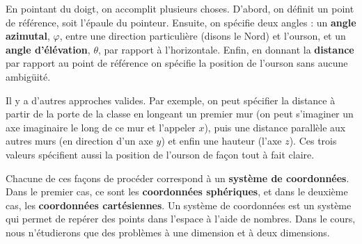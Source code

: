 \begin{marginfigure}
\end{marginfigure}

En pointant du doigt, on accomplit plusieurs choses.  D'abord, on définit un
point de référence, soit l'épaule du pointeur.  Ensuite, on spécifie deux
angles : un \textbf{angle azimutal}, $\varphi$, entre une direction
particulière (disons le Nord) et l'ourson, et un \textbf{angle d'élévation},
$\theta$, par rapport à l'horizontale.  Enfin, en donnant la \textbf{distance}
par rapport au point de référence on spécifie la position de l'ourson sans
aucune ambigüité.

Il y a d'autres approches valides.  Par exemple, on peut spécifier la distance
 à partir de la porte de la classe
en longeant un premier mur (on peut s'imaginer un axe imaginaire le long de ce
mur et l'appeler $x$), puis une distance parallèle aux autres murs (en
direction d'un axe $y$) et enfin une hauteur (l'axe $z$).  Ces trois valeurs
spécifient aussi la position de l'ourson de façon tout à fait claire.

Chacune de ces façons de procéder correspond à un \textbf{système de
  coordonnées}.  Dans le premier cas, ce sont les \textbf{coordonnées
  sphériques}, et dans le deuxième cas, les \textbf{coordonnées cartésiennes}.
Un système de coordonnées est un système qui permet de repérer des points dans
l'espace à l'aide de nombres.   Dans le cours, nous
n'étudierons que des problèmes à une dimension et à deux dimensions.

